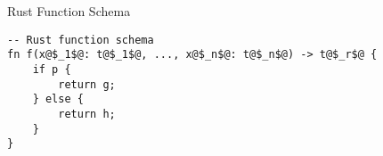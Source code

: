 \documentclass[12pt,t]{beamer}
\begin{document}
\begin{frame}[fragile]{Rust Function Schema}
\begin{center}
\vfill
\begin{verbatim}
-- Rust function schema
fn f(x@$_1$@: t@$_1$@, ..., x@$_n$@: t@$_n$@) -> t@$_r$@ {
    if p {
        return g;
    } else {
        return h;
    }
}
\end{verbatim}
\vfill
\end{center}
\end{frame}
\end{document}
